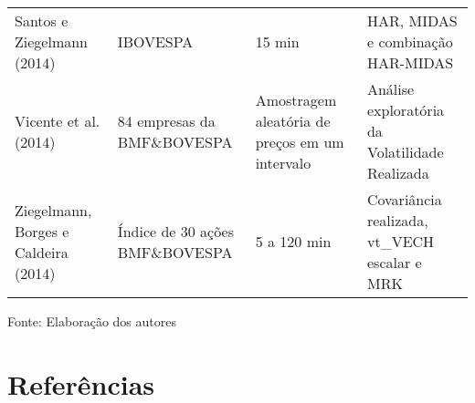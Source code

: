 \documentclass[]{article}
\begin{document}
\begin{longtable}[]{@{}llll@{}}
\begin{minipage}[t]{0.17\columnwidth}\raggedright\strut
Santos e Ziegelmann (2014)\strut
\end{minipage} & \begin{minipage}[t]{0.17\columnwidth}\raggedright\strut
IBOVESPA\strut
\end{minipage} & \begin{minipage}[t]{0.15\columnwidth}\raggedright\strut
15 min\strut
\end{minipage} & \begin{minipage}[t]{0.23\columnwidth}\raggedright\strut
HAR, MIDAS e combinação HAR-MIDAS\strut
\end{minipage}\tabularnewline
\begin{minipage}[t]{0.17\columnwidth}\raggedright\strut
Vicente et al. (2014)\strut
\end{minipage} & \begin{minipage}[t]{0.17\columnwidth}\raggedright\strut
84 empresas da BMF\&BOVESPA\strut
\end{minipage} & \begin{minipage}[t]{0.15\columnwidth}\raggedright\strut
Amostragem aleatória de preços em um intervalo\strut
\end{minipage} & \begin{minipage}[t]{0.23\columnwidth}\raggedright\strut
Análise exploratória da Volatilidade Realizada\strut
\end{minipage}\tabularnewline
\begin{minipage}[t]{0.17\columnwidth}\raggedright\strut
Ziegelmann, Borges e Caldeira (2014)\strut
\end{minipage} & \begin{minipage}[t]{0.17\columnwidth}\raggedright\strut
Índice de 30 ações BMF\&BOVESPA\strut
\end{minipage} & \begin{minipage}[t]{0.15\columnwidth}\raggedright\strut
5 a 120 min\strut
\end{minipage} & \begin{minipage}[t]{0.23\columnwidth}\raggedright\strut
Covariância realizada, vt\_VECH escalar e MRK\strut
\end{minipage}\tabularnewline
\bottomrule
\end{longtable}

Fonte: Elaboração dos autores

\pagebreak

\section*{Referências}\label{referencias}
\end{document}
